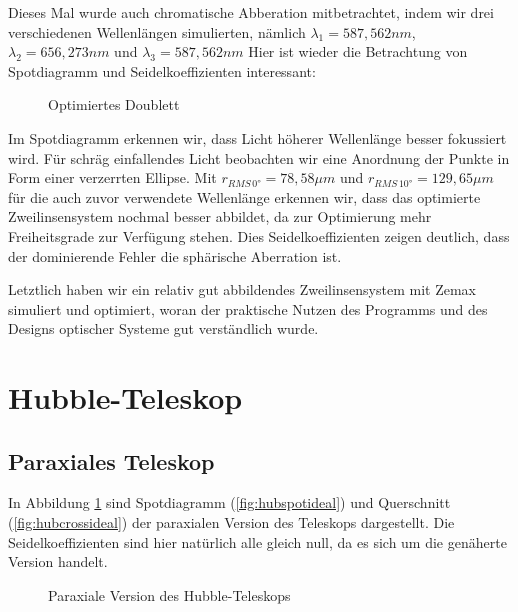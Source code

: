 \documentclass[twoside,colorback,accentcolor=tud4c,11pt]{tudreport}
\begin{document}
	Dieses Mal wurde auch chromatische Abberation mitbetrachtet, indem wir drei verschiedenen Wellenlängen simulierten, nämlich $\lambda_1 = 587,562 nm$, $\lambda_2 = 656,273 nm$ und $\lambda_3 = 587,562 nm$
	Hier ist wieder die Betrachtung von Spotdiagramm und Seidelkoeffizienten interessant:
	
	\begin{figure}[H]
\centering
  \quad
  \quad   
  \caption{Optimiertes Doublett}
\end{figure}
	
	Im Spotdiagramm erkennen wir, dass Licht höherer Wellenlänge besser fokussiert wird. Für schräg einfallendes Licht beobachten wir eine Anordnung der Punkte in Form einer verzerrten Ellipse.
	  Mit $r_{RMS \, 0°} = 78,58 \mu m $ und $r_{RMS \, 10°} = 129,65 \mu m $ für die auch zuvor verwendete Wellenlänge erkennen wir, dass das optimierte Zweilinsensystem nochmal besser abbildet, da zur Optimierung mehr Freiheitsgrade zur Verfügung stehen. 
	 Dies Seidelkoeffizienten zeigen deutlich, dass der dominierende Fehler die sphärische Aberration ist. 
	 
	 Letztlich haben wir ein relativ gut abbildendes Zweilinsensystem mit Zemax simuliert und optimiert, woran der praktische Nutzen des Programms und des Designs optischer Systeme gut verständlich wurde.
\section{Hubble-Teleskop}
\subsection{Paraxiales Teleskop}
In Abbildung \ref{fig:hubideal} sind Spotdiagramm (\ref{fig:hubspotideal}) und Querschnitt (\ref{fig:hubcrossideal}) der paraxialen Version des Teleskops dargestellt. Die Seidelkoeffizienten sind hier natürlich alle gleich null, da es sich um die genäherte Version handelt.
\begin{figure}[H]
\centering
  \quad
  \quad   
  \caption{Paraxiale Version des Hubble-Teleskops}
  \label{fig:hubideal}
\end{figure}
\end{document}

